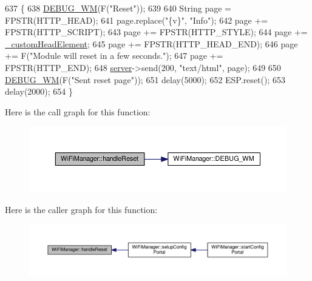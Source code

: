 \begin{DoxyCode}
637                               \{
638   \hyperlink{class_wi_fi_manager_ae5f595c670ccbcf9a191baf50f5c7c26}{DEBUG\_WM}(F(\textcolor{stringliteral}{"Reset"}));
639 
640   String page = FPSTR(HTTP\_HEAD);
641   page.replace(\textcolor{stringliteral}{"\{v\}"}, \textcolor{stringliteral}{"Info"});
642   page += FPSTR(HTTP\_SCRIPT);
643   page += FPSTR(HTTP\_STYLE);
644   page += \hyperlink{class_wi_fi_manager_a8860012564a62209d750c50e56319192}{\_customHeadElement};
645   page += FPSTR(HTTP\_HEAD\_END);
646   page += F(\textcolor{stringliteral}{"Module will reset in a few seconds."});
647   page += FPSTR(HTTP\_END);
648   \hyperlink{class_wi_fi_manager_a509523a01c0395cf0dc235b074f2a5ea}{server}->send(200, \textcolor{stringliteral}{"text/html"}, page);
649 
650   \hyperlink{class_wi_fi_manager_ae5f595c670ccbcf9a191baf50f5c7c26}{DEBUG\_WM}(F(\textcolor{stringliteral}{"Sent reset page"}));
651   delay(5000);
652   ESP.reset();
653   delay(2000);
654 \}
\end{DoxyCode}
Here is the call graph for this function\+:
\nopagebreak
\begin{figure}[H]
\begin{center}
\leavevmode
\includegraphics[width=350pt]{d4/dc8/class_wi_fi_manager_a94fb1a8fcfbd0d02714c69138bf72f9c_cgraph}
\end{center}
\end{figure}
Here is the caller graph for this function\+:
\nopagebreak
\begin{figure}[H]
\begin{center}
\leavevmode
\includegraphics[width=350pt]{d4/dc8/class_wi_fi_manager_a94fb1a8fcfbd0d02714c69138bf72f9c_icgraph}
\end{center}
\end{figure}
\mbox{\label{class_wi_fi_manager_a47e4c7df7478f690c53ff9f5125c9760}} 
